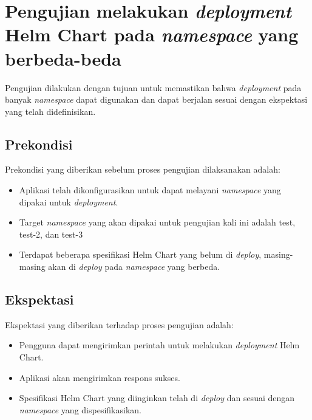 \section{Pengujian melakukan \textit{deployment} Helm Chart pada \textit{namespace} yang berbeda-beda}
Pengujian dilakukan dengan tujuan untuk memastikan bahwa \textit{deployment} pada banyak \textit{namespace} dapat digunakan dan dapat berjalan sesuai dengan ekspektasi yang telah didefinisikan.

\subsection{Prekondisi}
Prekondisi yang diberikan sebelum proses pengujian dilaksanakan adalah:
\begin{itemize}
    \item Aplikasi telah dikonfigurasikan untuk dapat melayani \textit{namespace} yang dipakai untuk \textit{deployment}.
    \item Target \textit{namespace} yang akan dipakai untuk pengujian kali ini adalah test, test-2, dan test-3
    \item Terdapat beberapa spesifikasi Helm Chart yang belum di \textit{deploy}, masing-masing akan di \textit{deploy} pada \textit{namespace} yang berbeda.
\end{itemize}
\subsection{Ekspektasi}
Ekspektasi yang diberikan terhadap proses pengujian adalah:
\begin{itemize}
    \item Pengguna dapat mengirimkan perintah untuk melakukan \textit{deployment} Helm Chart.
    \item Aplikasi akan mengirimkan respons sukses.
    \item Spesifikasi Helm Chart yang diinginkan telah di \textit{deploy} dan sesuai dengan \textit{namespace} yang dispesifikasikan.
\end{itemize}
